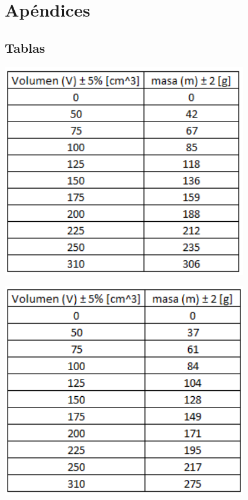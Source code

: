 \documentclass[DIV=calc, paper=a4, fontsize=11pt]{scrartcl}
\newenvironment{Figura}
  {\par\medskip\noindent\minipage{\linewidth}}
  {\endminipage\par\medskip}
\begin{document}
\begin{multicols}{2}
\begin{thebibliography}{99}
\end{thebibliography}

\section*{Apéndices}

\subsection*{Tablas}



\begin{Figura}
\centering
    \includegraphics[width=0.8\textwidth]{tabla agua.PNG}
    \label{fig}
\end{Figura}


\begin{Figura}
\centering
    \includegraphics[width=0.8\textwidth]{tabla aceite.PNG}
    \label{fig}
\end{Figura}



\end{multicols}
\end{document}
